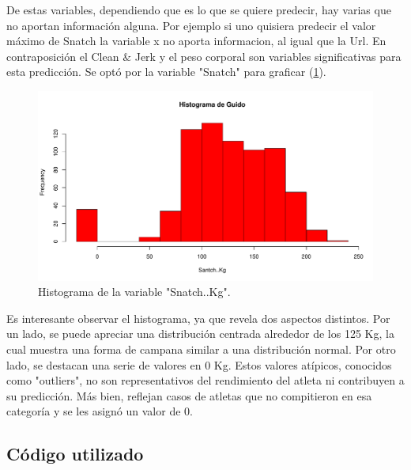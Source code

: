 De estas variables, dependiendo que es lo que se quiere predecir, hay varias que no aportan información alguna. Por ejemplo si uno quisiera predecir el valor máximo de Snatch la variable x no aporta informacion, al igual que la Url. En contraposición el Clean $\&$ Jerk y el peso corporal son variables significativas para esta predicción.
Se optó por la variable "Snatch" para graficar (\ref{fig:histSnatch}).
\begin{figure}[H]
	\centering
	\includegraphics[width=\linewidth]{../Ejercicio-1/ImagenesEjercicio1/histSnatch.pdf}
	\caption{Histograma de la variable "Snatch..Kg".}	
	\label{fig:histSnatch}
\end{figure}
Es interesante observar el histograma, ya que revela dos aspectos distintos. Por un lado, se puede apreciar una distribución centrada alrededor de los 125 Kg, la cual muestra una forma de campana similar a una distribución normal. Por otro lado, se destacan una serie de valores en 0 Kg. Estos valores atípicos, conocidos como "outliers", no son representativos del rendimiento del atleta ni contribuyen a su predicción. Más bien, reflejan casos de atletas que no compitieron en esa categoría y se les asignó un valor de 0.
\newpage
\subsection{Código utilizado}


%
